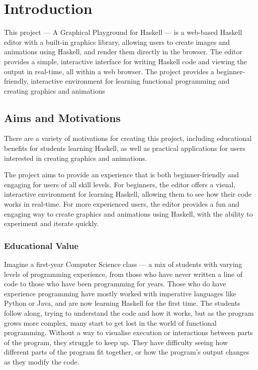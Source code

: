 \documentclass[../main.tex]{subfiles}
\begin{document}
\chapter{Introduction} \label{ch:introduction}
    This project — A Graphical Playground for Haskell — is a web-based Haskell
        editor with a built-in graphics library, allowing users to create images and
        animations using Haskell, and render them directly in the browser.
    The editor provides a simple, interactive interface for writing Haskell code
        and viewing the output in real-time, all within a web browser.
    The project provides a beginner-friendly, interactive environment for learning
        functional programming and creating graphics and animations

        \section{Aims and Motivations} There are a variety of motivations for creating
            this project, including educational benefits for students learning Haskell, as
            well as practical applications for users interested in creating graphics and
            animations.

    The project aims to provide an experience that is both beginner-friendly and
        engaging for users of all skill levels.
    For beginners, the editor offers a visual, interactive environment for learning
        Haskell, allowing them to see how their code works in real-time.
    For more experienced users, the editor provides a fun and engaging way to
        create graphics and animations using Haskell, with the ability to experiment
        and iterate quickly.

    \subsection{Educational Value}
        Imagine a first-year Computer Science class — a mix of students with varying
            levels of programming experience, from those who have never written a line of
            code to those who have been programming for years.
        Those who do have experience programming have mostly worked with imperative
            languages like Python or Java, and are now learning Haskell for the first time.
        The students follow along, trying to understand the code and how it works, but
            as the program grows more complex, many start to get lost in the world of
            functional programming.
        Without a way to visualise execution or interactions between parts of the
            program, they struggle to keep up.
        They have difficulty seeing how different parts of the program fit together, or
            how the program's output changes as they modify the code.
\end{document}
